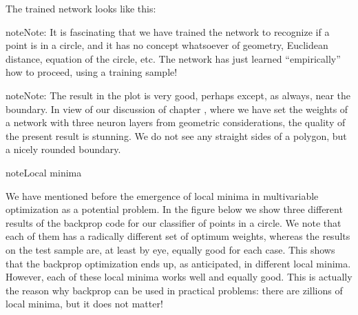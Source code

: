 \documentclass[letterpaper,10pt,english]{jupyterBook}
\begin{document}
\begin{sphinxVerbatim}[commandchars=\\\{\}]
\end{sphinxVerbatim}

\noindent{}

\sphinxAtStartPar
The trained network looks like this:

\begin{sphinxVerbatim}[commandchars=\\\{\}]
\end{sphinxVerbatim}

\noindent{}

\begin{sphinxadmonition}{note}{Note:}
\sphinxAtStartPar
It is fascinating that we have trained the network to recognize if a point is in a circle, and it has no concept whatsoever of geometry, Euclidean distance, equation of the circle, etc. The network has just learned “empirically” how to proceed, using a training sample!
\end{sphinxadmonition}

\begin{sphinxadmonition}{note}{Note:}
\sphinxAtStartPar
The result in the plot is very good, perhaps except, as always, near the boundary. In view of our discussion of chapter {\hyperref[\detokenize{docs/more_layers:more-lab}]{}}, where we have set the weights of a network with three neuron layers from geometric considerations, the quality of the present result is stunning. We do not see any straight sides of a polygon, but a nicely rounded boundary.
\end{sphinxadmonition}

\begin{sphinxadmonition}{note}{Local minima}

\sphinxAtStartPar
We have mentioned before the emergence of local minima in multi\sphinxhyphen{}variable optimization as a potential problem. In the figure below we show three different results of the backprop code for our classifier of points in a circle. We note that each of them has a radically different set of optimum weights, whereas the results on the test sample are, at least by eye, equally good for each case. This shows that the backprop optimization ends up, as anticipated, in different local minima. However, each of these local minima works well and equally good. This is actually the reason why backprop can be used in practical problems: there are zillions of local minima, but it does not matter!
\end{sphinxadmonition}
\end{document}
